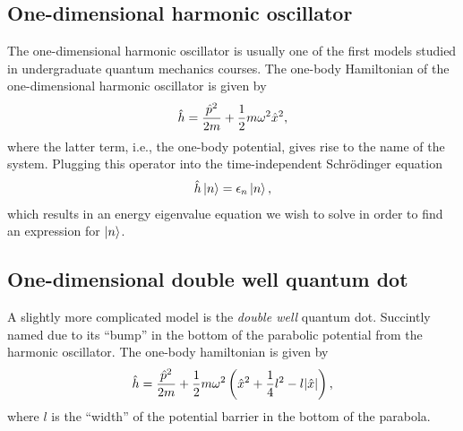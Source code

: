     \subsection{One-dimensional harmonic oscillator}
        The one-dimensional harmonic oscillator is usually one of the first
        models studied in undergraduate quantum mechanics courses.
        The one-body Hamiltonian of the one-dimensional harmonic oscillator is
        given by
        \begin{align}
            \hat{h} = \frac{\hat{p}^2}{2m} + \frac{1}{2} m\omega^2 \hat{x}^2,
            \label{eq:1dho-hamiltonian}
        \end{align}
        where the latter term, i.e., the one-body potential, gives rise to the
        name of the system.
        Plugging this operator into the time-independent Schrödinger equation
        \begin{gather}
            \hat{h}\ket{n} = \epsilon_n\ket{n},
        \end{gather}
        which results in an energy eigenvalue equation we wish to solve in order
        to find an expression for $\ket{n}$.

    \subsection{One-dimensional double well quantum dot}
        A slightly more complicated model is the \emph{double well} quantum dot.
        Succintly named due to its ``bump'' in the bottom of the parabolic
        potential from the harmonic oscillator. The one-body hamiltonian is
        given by
        \begin{align}
            \hat{h} = \frac{\hat{p}^2}{2m}
            + \frac{1}{2} m\omega^2\left( 
                \hat{x}^2
                + \frac{1}{4}l^2
                - l\abs{\hat{x}}
             \right),
        \end{align}
        where $l$ is the ``width'' of the potential barrier in the bottom of the
        parabola.

